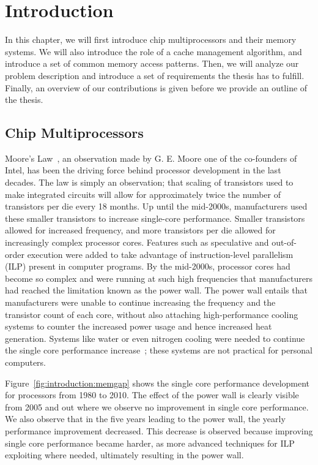 \chapter{Introduction}
\label{cpt:introduction}

In this chapter, we will first introduce chip multiprocessors and their memory systems.
We will also introduce the role of a cache management algorithm, and introduce a set of common memory access patterns.
Then, we will analyze our problem description and introduce a set of requirements the thesis has to fulfill.
Finally, an overview of our contributions is given before we provide an outline of the thesis.

\section{Chip Multiprocessors}

Moore's Law~\cite{Moore1998}, an observation made by G. E. Moore one of the co-founders of Intel, has been the driving force behind processor development in the last decades.
The law is simply an observation; that scaling of transistors used to make integrated circuits will allow for approximately twice the number of transistors per die every 18 months.
Up until the mid-2000s, manufacturers used these smaller transistors to increase single-core performance.
Smaller transistors allowed for increased frequency, and more transistors per die allowed for increasingly complex processor cores.
Features such as speculative and out-of-order execution were added to take advantage of instruction-level parallelism (ILP) present in computer programs.
By the mid-2000s, processor cores had become so complex and were running at such high frequencies that manufacturers had reached the limitation known as the power wall.
The power wall entails that manufacturers were unable to continue increasing the frequency and the transistor count of each core, without also attaching high-performance cooling systems to counter the increased power usage and hence increased heat generation.
Systems like water or even nitrogen cooling were needed to continue the single core performance increase~\cite{Sutter2005}; these systems are not practical for personal computers.

Figure~\ref{fig:introduction:memgap} shows the single core performance development for processors from 1980 to 2010.
The effect of the power wall is clearly visible from 2005 and out where we observe no improvement in single core performance.
We also observe that in the five years leading to the power wall, the yearly performance improvement decreased.
This decrease is observed because improving single core performance became harder, as more advanced techniques for ILP exploiting where needed, ultimately resulting in the power wall.

